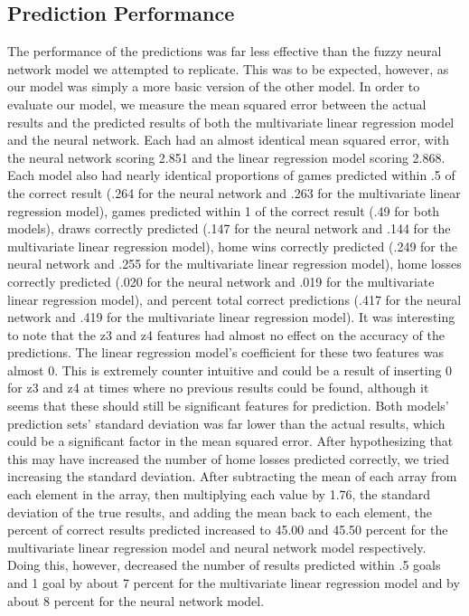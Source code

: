 \documentclass{article}
\begin{document}
\subsection{Prediction Performance}
The performance of the predictions was far less effective than the fuzzy neural network model we attempted to replicate. This was to be expected, however, as our model was simply a more basic version of the other model. In order to evaluate our model, we measure the mean squared error between the actual results and the predicted results of both the multivariate linear regression model and the neural network. Each had an almost identical mean squared error, with the neural network scoring 2.851 and the linear regression model scoring 2.868. Each model also had nearly identical proportions of games predicted within .5 of the correct result (.264 for the neural network and .263 for the multivariate linear regression model), games predicted within 1 of the correct result (.49 for both models), draws correctly predicted (.147 for the neural network and .144 for the multivariate linear regression model), home wins correctly predicted (.249 for the neural network and .255 for the multivariate linear regression model), home losses correctly predicted (.020 for the neural network and .019 for the multivariate linear regression model), and percent total correct predictions (.417 for the neural network and .419 for the multivariate linear regression model). It was interesting to note that the z3 and z4 features had almost no effect on the accuracy of the predictions. The linear regression model's coefficient for these two features was almost 0. This is extremely counter intuitive and could be a result of inserting 0 for z3 and z4 at times where no previous results could be found, although it seems that these should still be significant features for prediction. Both models' prediction sets' standard deviation was far lower than the actual results, which could be a significant factor in the mean squared error. After hypothesizing that this may have increased the number of home losses predicted correctly, we tried increasing the standard deviation. After subtracting the mean of each array from each element in the array, then multiplying each value by 1.76, the standard deviation of the true results, and adding the mean back to each element, the percent of correct results predicted increased to 45.00 and 45.50 percent for the multivariate linear regression model and neural network model respectively. Doing this, however, decreased the number of results predicted within .5 goals and 1 goal by about 7 percent for the multivariate linear regression model and by about 8 percent for the neural network model. 
\end{document}
